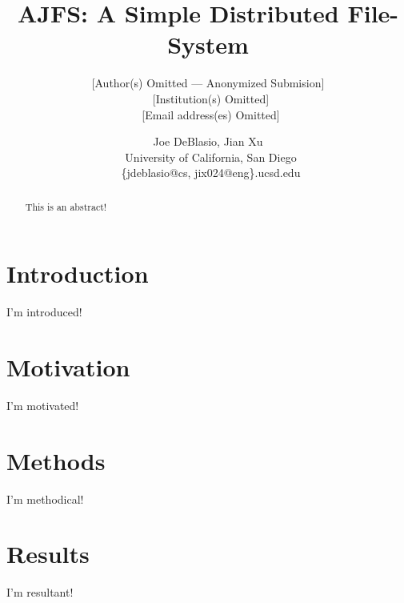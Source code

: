 \documentclass[preprint]{sig-alternate-10pt}
\begin{document}



\title{AJFS: A Simple Distributed File-System}

\ifanonymous
\author{[Author(s) Omitted --- Anonymized Submision]\\\
       [Institution(s) Omitted]\\\
       [Email address(es) Omitted]} %

\else
\author{Joe DeBlasio, Jian Xu\\\
       University of California, San Diego \\\
       \{jdeblasio@cs, jix024@eng\}.ucsd.edu}
\fi

\maketitle

\begin{abstract}
    This is an abstract!
\end{abstract}

\section{Introduction}
I'm introduced!

\section{Motivation}
I'm motivated!

\section{Methods}
I'm methodical!

\section{Results}
I'm resultant!
\end{document}
